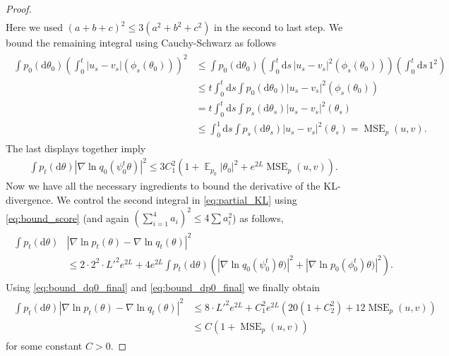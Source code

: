 \documentclass{article}
\theoremstyle{remark}
\DeclareMathOperator{\Ex}{\ensuremath{\mathbb{E}}}
\renewcommand{\d}{\mathrm{d}}
\DeclareMathOperator{\MSE}{MSE}
\begin{document}
\begin{proof}
\begin{align}
\end{align}
Here we used $(a+b+c)^2\leq 3(a^2+b^2+c^2)$ in the second to last step.
We bound the remaining integral using Cauchy-Schwarz as follows
\begin{align}
\begin{split}
     \int p_0(\d \theta_0) \left(\int_0^t 
    |u_s-v_s|(\phi_s(\theta_0))\right)^2
    &\leq 
     \int p_0(\d \theta_0) \left(\int_0^t \d s\, 
    |u_s-v_s|^2(\phi_s(\theta_0))\right) \left(\int_0^t \d s\, 
   1^2 \right)
  \\
  & \leq 
   t \int_0^t \d s \int p_0(\d \theta_0) |u_s-v_s|^2(\phi_s(\theta_0))
   \\
   &=
   t \int_0^t \d s \int p_s(\d \theta_s) |u_s-v_s|^2(\theta_s)
   \\
   &\leq \int_0^1 \d s \int p_s(\d \theta_s) |u_s-v_s|^2(\theta_s)=\MSE_p(u,v) .
   \end{split}
\end{align}
The last displays together imply
\begin{align}\label{eq:bound_dp0_final}
     \int p_t(\d \theta) |\nabla\ln q_0(\psi^t_0\theta)|^2
     \leq  3C_1^2\left(1 + \Ex_{p_0}|\theta_0|^2+e^{2L}
     \MSE_p(u,v)\right).
\end{align}
Now we have all the necessary ingredients to bound 
the derivative of the KL-divergence.
We control the second integral in \eqref{eq:partial_KL}
using \eqref{eq:bound_score} (and again $(\sum_{i=1}^4 a_i)^2\leq 4\sum a_i^2$) as follows,
\begin{align}
\begin{split}
\int p_t(\d \theta)&
    |\nabla \ln p_t(\theta)-
    \nabla \ln q_t(\theta)|^2
   \\&\leq  
   2\cdot 2^2 \cdot L'^2 e^{2L}+ 
   4e^{2L}
   \int p_t(\d \theta) \left(|\nabla\ln q_0(\psi^t_0)\theta)|^2
   +  |\nabla\ln p_0(\phi^t_0)\theta)|^2\right).
   \end{split}
\end{align}
Using \eqref{eq:bound_dq0_final} and \eqref{eq:bound_dp0_final} we finally obtain
\begin{align}
\begin{split}
    \int p_t(\d \theta)
    |\nabla \ln p_t(\theta)-
    \nabla \ln q_t(\theta)|^2
   & \leq 
   8 \cdot L'^2 e^{2L}
   + 
   C_1^2 e^{2L}\left( 20 (1+C_2^2)
   +12 \MSE_p(u,v)\right)
   \\
   &\leq
   C(1+\MSE_p(u,v))
   \end{split}
\end{align}
for some constant $C>0$.

\end{proof}
\end{document}
